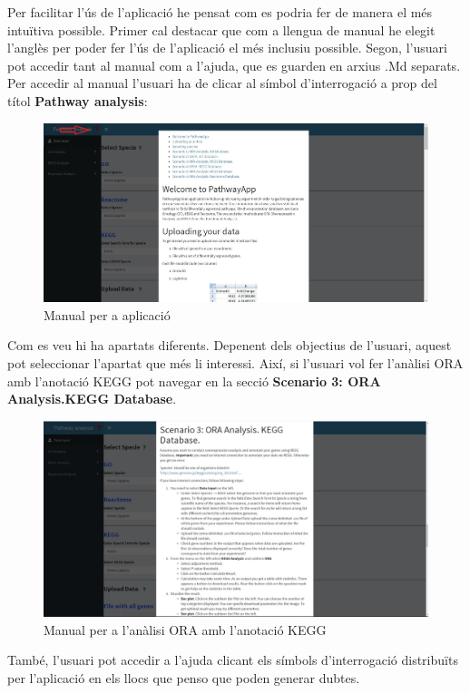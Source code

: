Per facilitar l'ús de l’aplicació he pensat com es podria fer de manera el més intuïtiva possible. Primer cal destacar que com a llengua de manual he elegit l’anglès per poder fer l'ús de l'aplicació el més inclusiu possible. Segon, l'usuari pot accedir tant al manual com a l'ajuda, que es guarden en arxius .Md separats. Per accedir al manual l'usuari ha de clicar al símbol d’interrogació a prop del títol \textbf{Pathway analysis}:
\begin{figure}[H]
\centering
\includegraphics[width=1\textwidth]{figures/Manual.jpg} 
\caption{Manual per a aplicació}
\end{figure}

Com es veu hi ha apartats diferents. Depenent dels objectius de l'usuari, aquest pot seleccionar l'apartat que més li interessi. Així, si l'usuari vol fer l'anàlisi \gls{ORA} amb l'anotació KEGG pot navegar en la secció \textbf{Scenario 3: \gls{ORA} Analysis.\gls{KEGG} Database}. 

\begin{figure}[H]
\centering
\includegraphics[width=1\textwidth]{figures/Manual2.jpg} 
\caption{Manual per a l'anàlisi \gls{ORA} amb l'anotació \gls{KEGG}}
\end{figure}


També, l'usuari pot accedir a l'ajuda clicant els símbols d'interrogació distribuïts per l’aplicació en els llocs que penso que poden generar dubtes. 

